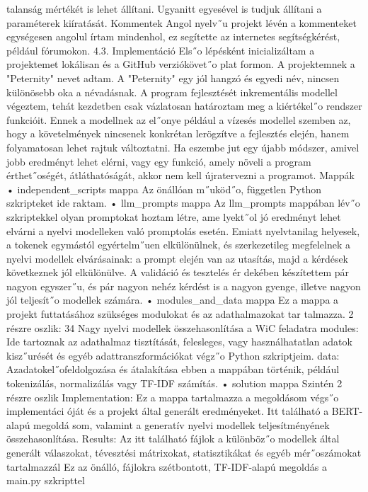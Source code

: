 \documentclass[12pt]{report}
\theoremstyle{definition}
\begin{document}
talanság mértékét is lehet állítani. Ugyanitt egyesével is tudjuk állítani a paraméterek
 kiíratását.
 Kommentek
 Angol nyelv˝u projekt lévén a kommenteket egységesen angolul írtam mindenhol,
 ez segítette az internetes segítségkérést, például fórumokon.
 4.3. Implementáció
 Els˝o lépésként inicializáltam a projektemet lokálisan és a GitHub verziókövet˝o plat
formon. A projektemnek a "Peternity" nevet adtam. A "Peternity" egy jól hangzó és
 egyedi név, nincsen különösebb oka a névadásnak. A program fejlesztését inkrementális
 modellel végeztem, tehát kezdetben csak vázlatosan határoztam meg a kiértékel˝o rendszer
 funkcióit. Ennek a modellnek az el˝onye például a vízesés modellel szemben az, hogy a
 követelmények nincsenek konkrétan lerögzítve a fejlesztés elején, hanem folyamatosan
 lehet rajtuk változtatni. Ha eszembe jut egy újabb módszer, amivel jobb eredményt lehet
 elérni, vagy egy funkció, amely növeli a program érthet˝oségét, átláthatóságát, akkor nem
 kell újratervezni a programot.
 Mappák
 • independent_scripts mappa
 Az önállóan m˝uköd˝o, független Python szkripteket ide raktam.
 • llm_prompts mappa
 Az llm_prompts mappában lév˝o szkriptekkel olyan promptokat hoztam létre, ame
lyekt˝ol jó eredményt lehet elvárni a nyelvi modelleken való promptolás esetén.
 Emiatt nyelvtanilag helyesek, a tokenek egymástól egyértelm˝uen elkülönülnek, és
 szerkezetileg megfelelnek a nyelvi modellek elvárásainak: a prompt elején van az
 utasítás, majd a kérdések következnek jól elkülönülve. A validáció és tesztelés ér
dekében készítettem pár nagyon egyszer˝u, és pár nagyon nehéz kérdést is a nagyon
 gyenge, illetve nagyon jól teljesít˝o modellek számára.
 • modules_and_data mappa
 Ez a mappa a projekt futtatásához szükséges modulokat és az adathalmazokat tar
talmazza. 2 részre oszlik:
 34
Nagy nyelvi modellek összehasonlítása a WiC feladatra
 modules: Ide tartoznak az adathalmaz tisztítását, felesleges, vagy használhatatlan
 adatok kisz˝urését és egyéb adattranszformációkat végz˝o Python szkriptjeim.
 data: Azadatokel˝ofeldolgozása és átalakítása ebben a mappában történik, például
 tokenizálás, normalizálás vagy TF-IDF számítás.
 • solution mappa
 Szintén 2 részre oszlik
 Implementation: Ez a mappa tartalmazza a megoldásom végs˝o implementáci
óját és a projekt által generált eredményeket. Itt található a BERT-alapú megoldá
som, valamint a generatív nyelvi modellek teljesítményének összehasonlítása.
 Results: Az itt található fájlok a különböz˝o modellek által generált válaszokat,
 tévesztési mátrixokat, statisztikákat és egyéb mér˝oszámokat tartalmazzál
 Ez az önálló, fájlokra szétbontott, TF-IDF-alapú megoldás a main.py szkripttel
\end{document}
